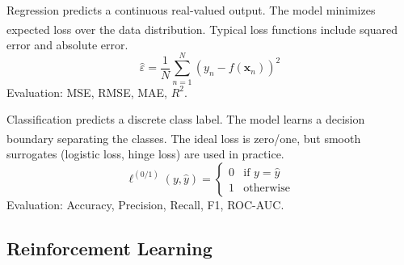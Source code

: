 \begin{tcbitemize}[ skin=sectionraster ]
    \tcbitem[title=Regression, raster multicolumn=3]
    Regression predicts a continuous real-valued output.
    The model minimizes expected loss over the data distribution\textsuperscript{\cite[][pp.~8--9]{iiiCourseMachineLearning}}.
    Typical loss functions include squared error and absolute error.
    \tcblower
    \begin{equation}
        \hat{\varepsilon} = \frac{1}{N}\sum_{n=1}^{N}(y_n - f(\mathbf{x}_n))^2
    \end{equation}
    Evaluation: MSE, RMSE, MAE, $R^2$.

    \tcbitem[title=Classification, raster multicolumn=3]
    Classification predicts a discrete class label.
    The model learns a decision boundary separating the classes\textsuperscript{\cite[][pp.~10--12]{iiiCourseMachineLearning}}.
    The ideal loss is zero/one, but smooth surrogates (logistic loss, hinge loss) are used in practice.
    \tcblower
    \begin{equation}
        \ell^{(0/1)}(y, \hat{y}) = \begin{cases} 0 & \text{if } y = \hat{y} \\ 1 & \text{otherwise} \end{cases}
    \end{equation}
    Evaluation: Accuracy, Precision, Recall, F1, ROC-AUC.
\end{tcbitemize}

\subsection{Reinforcement Learning}


